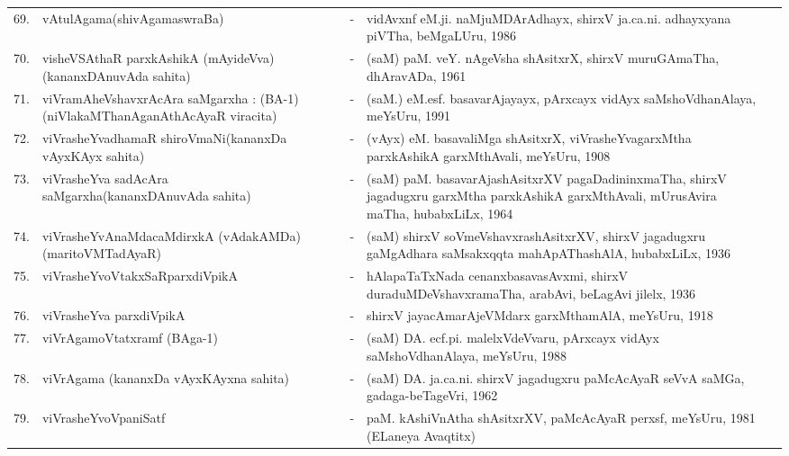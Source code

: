 {\begin{longtable}{lp{5cm}cp{5cm}<{\raggedright}p{3cm}<{\raggedright}@{}}
69. & vAtulAgama\newline (shivAgamaswraBa) &-& vidAvxnf eM.ji. naMjuMDArAdhayx, shirxV ja.ca.ni. adhayxyana piVTha, beMgaLUru, 1986\\
70. & visheVSAthaR parxkAshikA (mAyideVva)\newline (kananxDAnuvAda sahita) &-& (saM) paM. veY. nAgeVsha shAsitxrX, shirxV muruGAmaTha, dhAravADa, 1961\\
71. & viVramAheVshavxrAcAra saMgarxha : (BA-1)\newline (niVlakaMThanAganAthAcAyaR viracita) &-& (saM.) eM.esf. basavarAjayayx, pArxcayx vidAyx saMshoVdhanAlaya, meYsUru, 1991\\
72. & viVrasheYvadhamaR shiroVmaNi\newline (kananxDa vAyxKAyx sahita) &-& (vAyx) eM. basavaliMga shAsitxrX, viVrasheYvagarxMtha parxkAshikA garxMthAvali, meYsUru, 1908\\
73. & viVrasheYva sadAcAra saMgarxha\newline (kananxDAnuvAda sahita) &-& (saM) paM. basavarAjashAsitxrXV pagaDadininxmaTha, shirxV jagadugxru garxMtha parxkAshikA garxMthAvali, mUrusAvira maTha, hubabxLiLx, 1964\\
74. & viVrasheYvAnaMdacaMdirxkA (vAdakAMDa)\newline (maritoVMTadAyaR) &-& (saM) shirxV soVmeVshavxrashAsitxrXV, shirxV jagadugxru gaMgAdhara saMsakxqqta mahApAThashAlA, hubabxLiLx, 1936\\
75. & viVrasheYvoVtakxSaRparxdiVpikA &-& hAlapaTaTxNada cenanxbasavasAvxmi, shirxV duraduMDeVshavxramaTha, arabAvi, beLagAvi jilelx, 1936\\
76. & viVrasheYva parxdiVpikA &-& shirxV jayacAmarAjeVMdarx garxMthamAlA, meYsUru, 1918\\
77. & viVrAgamoVtatxramf (BAga-1) &-& (saM) DA. ecf.pi. malelxVdeVvaru, pArxcayx vidAyx saMshoVdhanAlaya, meYsUru, 1988\\
78. & viVrAgama (kananxDa vAyxKAyxna sahita) &-& (saM) DA. ja.ca.ni. shirxV jagadugxru paMcAcAyaR seVvA saMGa, gadaga-beTageVri, 1962\\
79. & viVrasheYvoVpaniSatf &-& paM. kAshiVnAtha shAsitxrXV, paMcAcAyaR perxsf, meYsUru, 1981 (ELaneya Avaqtitx)\\

\end{longtable}}
